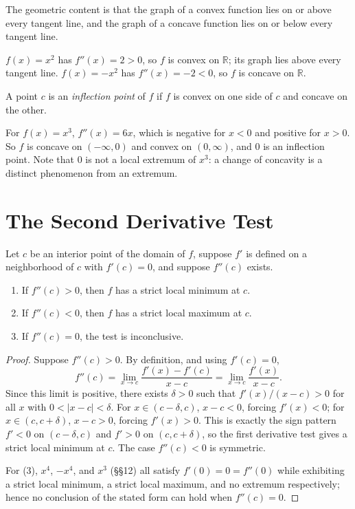 \documentclass{essay}
\begin{document}
The geometric content is that the graph of a convex function lies on or
above every tangent line, and the graph of a concave function lies on or
below every tangent line.

\begin{example}
\(f(x)=x^2\) has \(f''(x)=2>0\), so \(f\) is convex on \(\mathbb{R}\); its
graph lies above every tangent line. \(f(x)=-x^2\) has \(f''(x)=-2<0\), so
\(f\) is concave on \(\mathbb{R}\).
\end{example}

\begin{definition}
A point \(c\) is an \emph{inflection point} of \(f\) if \(f\) is convex on
one side of \(c\) and concave on the other.
\end{definition}

\begin{example}
For \(f(x)=x^3\), \(f''(x)=6x\), which is negative for \(x<0\) and positive
for \(x>0\). So \(f\) is concave on \((-\infty,0)\) and convex on
\((0,\infty)\), and \(0\) is an inflection point. Note that \(0\) is not a
local extremum of \(x^3\): a change of concavity is a distinct phenomenon
from an extremum.
\end{example}

\section{The Second Derivative Test}

\begin{theorem}
Let \(c\) be an interior point of the domain of \(f\), suppose \(f'\) is
defined on a neighborhood of \(c\) with \(f'(c)=0\), and suppose \(f''(c)\)
exists.
\begin{enumerate}
    \item If \(f''(c)>0\), then \(f\) has a strict local minimum at \(c\).
    \item If \(f''(c)<0\), then \(f\) has a strict local maximum at \(c\).
    \item If \(f''(c)=0\), the test is inconclusive.
\end{enumerate}
\end{theorem}

\begin{proof}
Suppose \(f''(c)>0\). By definition, and using \(f'(c)=0\),
\[
f''(c)=\lim_{x\to c}\frac{f'(x)-f'(c)}{x-c}=\lim_{x\to c}\frac{f'(x)}{x-c}.
\]
Since this limit is positive, there exists \(\delta>0\) such that
\(f'(x)/(x-c)>0\) for all \(x\) with \(0<|x-c|<\delta\). For \(x\in
(c-\delta,c)\), \(x-c<0\), forcing \(f'(x)<0\); for \(x\in(c,c+\delta)\),
\(x-c>0\), forcing \(f'(x)>0\). This is exactly the sign pattern
\(f'<0\) on \((c-\delta,c)\) and \(f'>0\) on \((c,c+\delta)\), so the first
derivative test gives a strict local minimum at \(c\). The case
\(f''(c)<0\) is symmetric.

For (3), \(x^4\), \(-x^4\), and \(x^3\) (\S\S 12) all satisfy \(f'(0)=0=f''(0)\)
while exhibiting a strict local minimum, a strict local maximum, and no
extremum respectively; hence no conclusion of the stated form can hold when
\(f''(c)=0\).
\end{proof}
\end{document}
